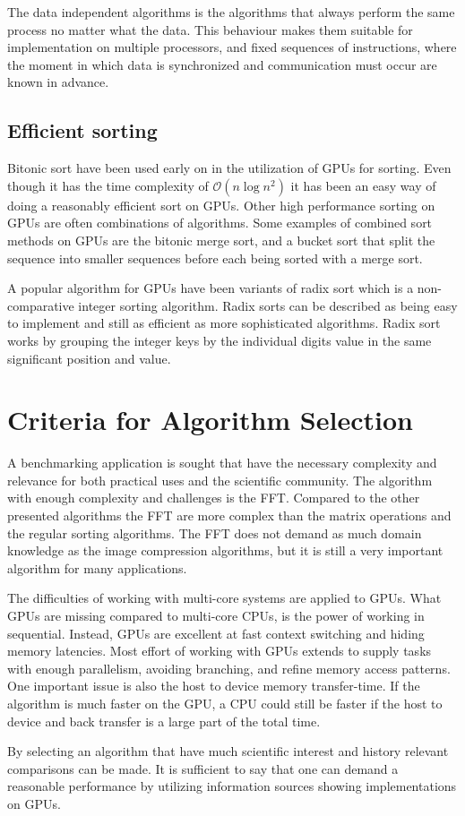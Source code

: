 The data independent algorithms is the algorithms that always perform the same process no matter what the data. This behaviour makes them suitable for implementation on multiple processors, and fixed sequences of instructions, where the moment in which data is synchronized and communication must occur are known in advance.

\subsection{Efficient sorting}
Bitonic sort have been used early on in the utilization of \gls{GPU}s for sorting. Even though it has the time complexity of $\mathcal{O}(n\log{n^2})$ it has been an easy way of doing a reasonably efficient sort on \gls{GPU}s. Other high performance sorting on \gls{GPU}s are often combinations of algorithms. Some examples of combined sort methods on GPUs are the bitonic merge sort, and a bucket sort that split the sequence into smaller sequences before each being sorted with a merge sort.

A popular algorithm for GPUs have been variants of radix sort which is a non-comparative integer sorting algorithm. Radix sorts can be described as being easy to implement and still as efficient as more sophisticated algorithms. Radix sort works by grouping the integer keys by the individual digits value in the same significant position and value.

\section{Criteria for Algorithm Selection}
A benchmarking application is sought that have the necessary complexity and relevance for both practical uses and the scientific community. The algorithm with enough complexity and challenges is the \gls{FFT}. Compared to the other presented algorithms the \gls{FFT} are more complex than the matrix operations and the regular sorting algorithms. The \gls{FFT} does not demand as much domain knowledge as the image compression algorithms, but it is still a very important algorithm for many applications.

The difficulties of working with multi-core systems are applied to \gls{GPU}s. What \gls{GPU}s are missing compared to multi-core \gls{CPU}s, is the power of working in sequential. Instead, \gls{GPU}s are excellent at fast context switching and hiding memory latencies. Most effort of working with \gls{GPU}s extends to supply tasks with enough parallelism, avoiding branching, and refine memory access patterns. One important issue is also the host to device memory transfer-time. If the algorithm is much faster on the \gls{GPU}, a \gls{CPU} could still be faster if the host to device and back transfer is a large part of the total time.

By selecting an algorithm that have much scientific interest and history relevant comparisons can be made. It is sufficient to say that one can demand a reasonable performance by utilizing information sources showing implementations on \gls{GPU}s.